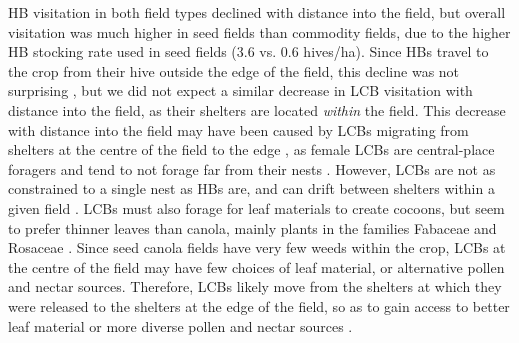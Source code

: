 \documentclass[12pt]{article} %
\begin{document}
HB visitation in both field types declined with distance into the field, but overall visitation was much higher in seed fields than commodity fields, due to the higher HB stocking rate used in seed fields (3.6 vs. 0.6 hives/ha).
Since HBs travel to the crop from their hive outside the edge of the field, this decline was not surprising \citep{robinson2022}, but we did not expect a similar decrease in LCB visitation with distance into the field, as their shelters are located \textit{within} the field.
This decrease with distance into the field may have been caused by LCBs migrating from shelters at the centre of the field to the edge \citep{goerzen1995}, as female LCBs are central-place foragers and tend to not forage far from their nests \citep{peterson2005,pitts2011, brunet2019}.
However, LCBs are not as constrained to a single nest as HBs are, and can drift between shelters within a given field \citep{goerzen1995, pittsSinger2013}.
LCBs must also forage for leaf materials to create cocoons, but seem to prefer thinner leaves than canola, mainly plants in the families Fabaceae and Rosaceae \citep{sinu2018}.
Since seed canola fields have very few weeds within the crop, LCBs at the centre of the field may have few choices of leaf material, or alternative pollen and nectar sources.
Therefore, LCBs likely move from the shelters at which they were released to the shelters at the edge of the field, so as to gain access to better leaf material or more diverse pollen and nectar sources \citep{horne1995, horne1995b}.
\end{document}
